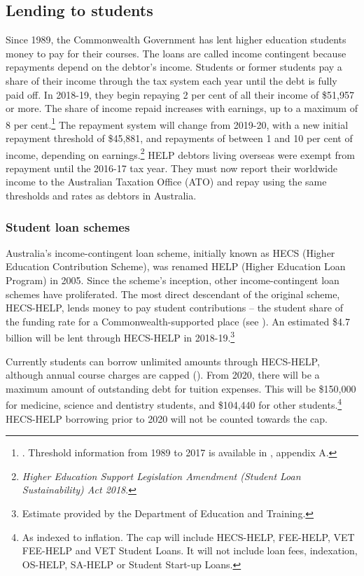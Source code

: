 \documentclass{grattan}
\begin{document}
%
\subsection{Lending to students}\label{subsec:lending-to-students}

Since 1989, the Commonwealth Government has lent higher education students money to pay for their courses. The loans are called income contingent because repayments depend on the debtor's income. Students or former students pay a share of their income through the tax system each year until the debt is fully paid off. In 2018-19, they begin repaying 2 per cent of all their income of \$51,957 or more. The share of income repaid increases with earnings, up to a maximum of 8 per cent.\footnote{\textcite[][]{ATO2018helpsslabstudy}. Threshold information from 1989 to 2017 is available in \textcite[][]{Norton2016helpforthefuture}, appendix A.} The repayment system will change from 2019-20, with a new initial repayment threshold of \$45,881, and repayments of between 1 and 10 per cent of income, depending on earnings.\footnote{\emph{Higher Education Support Legislation Amendment (Student Loan Sustainability) Act 2018}.} HELP debtors living overseas were exempt from repayment until the 2016-17 tax year. They must now report their worldwide income to the Australian Taxation Office (ATO) and repay using the same thresholds and rates as debtors in Australia.

%
\subsubsection{Student loan schemes}\label{subsubsec:student-loan-schemes}

Australia's income-contingent loan scheme, initially known as HECS (Higher Education Contribution Scheme), was renamed HELP (Higher Education Loan Program) in 2005. Since the scheme's inception, other income-contingent loan schemes have proliferated. The most direct descendant of the original scheme, HECS-HELP, lends money to pay student contributions -- the student share of the funding rate for a Commonwealth-supported place (see ). An estimated \$4.7 billion will be lent through HECS-HELP in 2018-19.\footnote{Estimate provided by the Department of Education and Training.}

Currently students can borrow unlimited amounts through HECS-HELP, although annual course charges are capped (). From 2020, there will be a maximum amount of outstanding debt for tuition expenses. This will be \$150,000 for medicine, science and dentistry students, and \$104,440 for other students.\footnote{As indexed to inflation. The cap will include HECS-HELP, FEE-HELP, VET FEE-HELP and VET Student Loans. It will not include loan fees, indexation, OS-HELP, SA-HELP or Student Start-up Loans.} HECS-HELP borrowing prior to 2020 will not be counted towards the cap.
\end{document}
